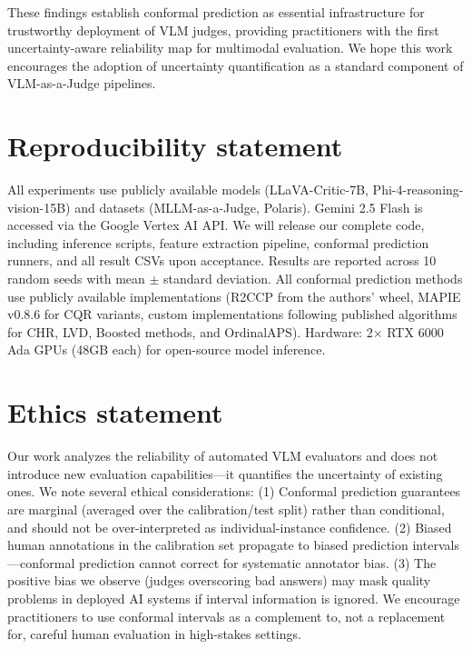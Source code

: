 \documentclass{article}
\begin{document}
These findings establish conformal prediction as essential infrastructure for trustworthy deployment of VLM judges, providing practitioners with the first uncertainty-aware reliability map for multimodal evaluation. We hope this work encourages the adoption of uncertainty quantification as a standard component of VLM-as-a-Judge pipelines.

\section*{Reproducibility statement}
All experiments use publicly available models (LLaVA-Critic-7B, Phi-4-reasoning-vision-15B) and datasets (MLLM-as-a-Judge, Polaris). Gemini 2.5 Flash is accessed via the Google Vertex AI API. We will release our complete code, including inference scripts, feature extraction pipeline, conformal prediction runners, and all result CSVs upon acceptance. Results are reported across 10 random seeds with mean $\pm$ standard deviation. All conformal prediction methods use publicly available implementations (R2CCP from the authors' wheel, MAPIE v0.8.6 for CQR variants, custom implementations following published algorithms for CHR, LVD, Boosted methods, and OrdinalAPS). Hardware: 2$\times$ RTX 6000 Ada GPUs (48GB each) for open-source model inference.

\section*{Ethics statement}
Our work analyzes the reliability of automated VLM evaluators and does not introduce new evaluation capabilities---it quantifies the uncertainty of existing ones. We note several ethical considerations: (1) Conformal prediction guarantees are marginal (averaged over the calibration/test split) rather than conditional, and should not be over-interpreted as individual-instance confidence. (2) Biased human annotations in the calibration set propagate to biased prediction intervals---conformal prediction cannot correct for systematic annotator bias. (3) The positive bias we observe (judges overscoring bad answers) may mask quality problems in deployed AI systems if interval information is ignored. We encourage practitioners to use conformal intervals as a complement to, not a replacement for, careful human evaluation in high-stakes settings.




\end{document}
